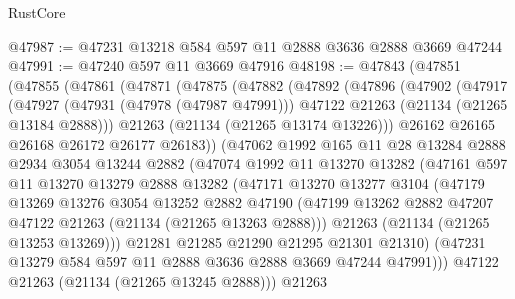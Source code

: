 \begin{lexlean}{RustCore}
\begin{coremodule}
@47987 := @47231 @13218 @584 @597 @11 @2888 @3636 @2888 @3669 @47244
@47991 := @47240 @597 @11 @3669 @47916
@48198 := @47843
    (@47851
      (@47855
        (@47861
          (@47871
            (@47875
              (@47882
                (@47892
                  (@47896
                    (@47902
                      (@47917
                        (@47927
                          (@47931 (@47978 (@47987 @47991)))
                          @47122
                          @21263
                          (@21134 (@21265 @13184 @2888)))
                        @21263
                        (@21134 (@21265 @13174 @13226)))
                      @26162
                      @26165
                      @26168
                      @26172
                      @26177
                      @26183))
                  (@47062
                    @1992
                    @165
                    @11
                    @28
                    @13284
                    @2888
                    @2934
                    @3054
                    @13244
                    @2882
                    (@47074
                      @1992
                      @11
                      @13270
                      @13282
                      (@47161
                        @597
                        @11
                        @13270
                        @13279
                        @2888
                        @13282
                        (@47171
                          @13270
                          @13277
                          @3104
                          (@47179
                            @13269
                            @13276
                            @3054
                            @13252
                            @2882
                            @47190
                            (@47199
                              @13262
                              @2882
                              @47207
                              @47122
                              @21263
                              (@21134 (@21265 @13263 @2888)))
                            @21263
                            (@21134 (@21265 @13253 @13269)))
                          @21281
                          @21285
                          @21290
                          @21295
                          @21301
                          @21310)
                        (@47231 @13279 @584 @597 @11 @2888 @3636 @2888 @3669 @47244 @47991)))
                    @47122
                    @21263
                    (@21134 (@21265 @13245 @2888)))
                  @21263

\end{coremodule}
\end{lexlean}
